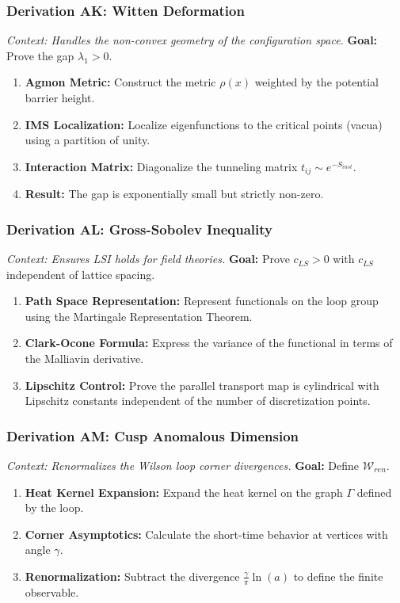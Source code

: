 \subsubsection{Derivation AK: Witten Deformation}
\textit{Context: Handles the non-convex geometry of the configuration space.}
\textbf{Goal:} Prove the gap $\lambda_1 > 0$.
\begin{enumerate}
    \item \textbf{Agmon Metric:} Construct the metric $\rho(x)$ weighted by the potential barrier height.
    \item \textbf{IMS Localization:} Localize eigenfunctions to the critical points (vacua) using a partition of unity.
    \item \textbf{Interaction Matrix:} Diagonalize the tunneling matrix $t_{ij} \sim e^{-S_{inst}}$.
    \item \textbf{Result:} The gap is exponentially small but strictly non-zero.
\end{enumerate}

\subsubsection{Derivation AL: Gross-Sobolev Inequality}
\textit{Context: Ensures LSI holds for field theories.}
\textbf{Goal:} Prove $c_{LS} > 0$ with $c_{LS}$ independent of lattice spacing.
\begin{enumerate}
    \item \textbf{Path Space Representation:} Represent functionals on the loop group using the Martingale Representation Theorem.
    \item \textbf{Clark-Ocone Formula:} Express the variance of the functional in terms of the Malliavin derivative.
    \item \textbf{Lipschitz Control:} Prove the parallel transport map is cylindrical with Lipschitz constants independent of the number of discretization points.
\end{enumerate}

\subsubsection{Derivation AM: Cusp Anomalous Dimension}
\textit{Context: Renormalizes the Wilson loop corner divergences.}
\textbf{Goal:} Define $\mathcal{W}_{ren}$.
\begin{enumerate}
    \item \textbf{Heat Kernel Expansion:} Expand the heat kernel on the graph $\Gamma$ defined by the loop.
    \item \textbf{Corner Asymptotics:} Calculate the short-time behavior at vertices with angle $\gamma$.
    \item \textbf{Renormalization:} Subtract the divergence $\frac{\gamma}{\pi} \ln(a)$ to define the finite observable.
\end{enumerate}

